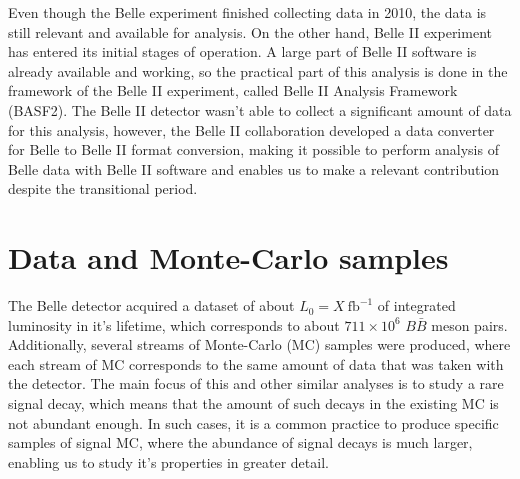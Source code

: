 \documentclass[  headings=standardclasses,
  headings=big,oneside,a4paper,openany,12pt]{scrbook}
\newcommand {\e}[1]{\mathrm{~#1}}
\newcommand {\E}[1]{\times 10^{#1}}
\begin{document}
Even though the Belle experiment finished collecting data in 2010, the data is still relevant and available for analysis. On the other hand, Belle II experiment has entered its initial stages of operation. A large part of Belle II software is already available and working, so the practical part of this analysis is done in the framework of the Belle II experiment, called Belle II Analysis Framework (BASF2). The Belle II detector wasn't able to collect a significant amount of data for this analysis, however, the Belle II collaboration developed a data converter for Belle to Belle II format conversion, making it possible to perform analysis of Belle data with Belle II software and enables us to make a relevant contribution despite the transitional period.

\chapter{Data and Monte-Carlo samples}

The Belle detector acquired a dataset of about $L_0 = X\e{fb^{-1}}$ of integrated luminosity in it's lifetime, which corresponds to about $711\E{6}$ $B \bar B$ meson pairs. Additionally, several streams of Monte-Carlo (MC) samples were produced, where each stream of MC corresponds to the same amount of data that was taken with the detector. The main focus of this and other similar analyses is to study a rare signal decay, which means that the amount of such decays in the existing MC is not abundant enough. In such cases, it is a common practice to produce specific samples of signal MC, where the abundance of signal decays is much larger, enabling us to study it's properties in greater detail.
\end{document}
